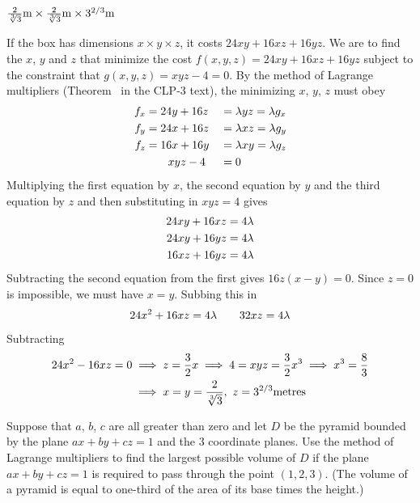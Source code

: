%

\begin{answer}
$\frac{2}{\root 3\of 3}{\rm m}\times\frac{2}{\root 3\of 3}{\rm m}
                                \times 3^{2/3}{\rm m}$
\end{answer}

\begin{solution}
If the box has dimensions $x\times y\times z$, it costs
$24xy+16xz+16yz$. We are to find the $x$, $y$ and $z$ that minimize the cost $f(x,y,z)=24xy+16xz+16yz$ subject to the constraint that $g(x,y,z)=xyz-4=0$. 
By the method of Lagrange multipliers (Theorem~ 
in the CLP-3 text), the minimizing $x$, $y$, $z$ must obey
\begin{alignat*}{3}
f_x&=24y+16z&&=\lambda yz=\lambda g_x \\
f_y&=24x+16z&&=\lambda xz=\lambda g_y \\
f_z&=16x+16y&&=\lambda xy=\lambda g_z \\
&\ \ \ \ \ \  xyz-4&&=0
\end{alignat*}
Multiplying the first equation by $x$, the second equation by $y$ 
and the third equation by $z$ and then substituting in $xyz=4$ gives
\begin{align*}
24xy+16xz&=4\lambda \\
24xy+16yz&=4\lambda \\
16xz+16yz&=4\lambda
\end{align*}
Subtracting the second equation from the first gives $16z(x-y)=0$.
Since $z=0$ is impossible, we must have $x=y$. Subbing this in
\begin{equation*}
24x^2+16xz=4\lambda\qquad 32xz=4\lambda
\end{equation*}
Subtracting
\begin{align*}
24x^2-16xz=0&\implies z=\frac{3}{2}x
\implies 4=xyz=\frac{3}{2}x^3
\implies x^3=\frac{8}{3} \\
&\implies x=y=\frac{2}{\root 3\of 3},\ z=3^{2/3}{\rm metres}
\end{align*}
\end{solution}

\begin{question}[M200 2000A] %
Suppose that $a$, $b$, $c$ are all greater than zero and let 
$D$ be the pyramid bounded by the plane $ax+by+cz=1$ and the 3 
coordinate planes. Use the method of Lagrange multipliers to find the 
largest possible volume of $D$ if the plane $ax + by + cz = 1$ is required 
to pass through the point $(1, 2, 3)$. (The volume of a pyramid is equal to one-third of the area of its base times the height.) 
\end{question}


